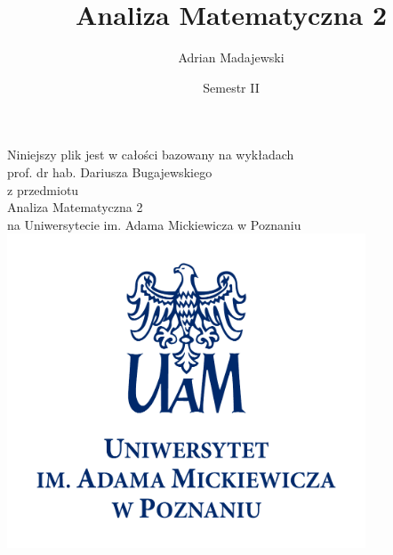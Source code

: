\documentclass[leqno]{article}
\title{\Huge{Analiza Matematyczna 2}}
\author{Adrian Madajewski}
\date{Semestr II}
\begin{document}

\maketitle

\begin{center}
    Niniejszy plik jest w całości bazowany na wykładach \\
    \vspace{10pt}
    prof. dr hab. Dariusza Bugajewskiego \\
    \vspace{10pt}
    z przedmiotu \\
    \vspace{10pt}
    Analiza Matematyczna 2 \\
    \vspace{10pt}
    na Uniwersytecie im. Adama Mickiewicza w Poznaniu
    \includegraphics[width=0.8\textwidth]{uam_logo.pdf}
\end{center}
\newpage
\end{document}

